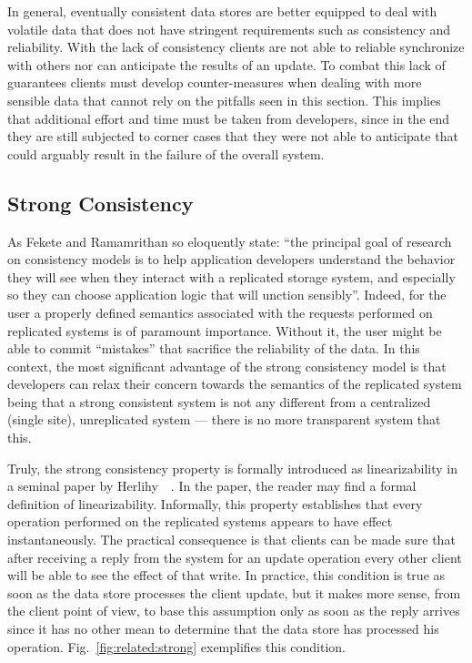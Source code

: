 In general, eventually consistent data stores are better equipped to deal with volatile data that does not have stringent requirements such as consistency and reliability.
With the lack of consistency clients are not able to reliable  synchronize with others nor can anticipate the results of an update. 
To combat this lack of guarantees clients must develop counter-measures when dealing with more sensible data that cannot rely on the pitfalls seen in this section. 
This implies that additional effort and time must be taken from developers, since in the end they are still subjected to corner cases that they were not able to anticipate  that could arguably result in the failure of the overall system. 


\subsection{Strong Consistency}
As Fekete and Ramamrithan so eloquently state: ``the principal goal of research on consistency models is to help application developers understand the behavior they will see when they interact with a replicated storage system, and especially so they can choose application logic that will unction sensibly''. \cite{fekete2010consistency}
Indeed, for the user a properly defined semantics associated with the requests performed on replicated systems is of paramount importance. 
Without it, the user might be able to commit ``mistakes'' that sacrifice the reliability of the data. 
In this context, the most significant advantage of the strong consistency model  is that developers can relax their concern towards the semantics of the replicated system being that a strong consistent system is not any different from a centralized (single site), unreplicated system --- there is no more transparent system that this. 

Truly, the strong consistency property is formally introduced as linearizability in a seminal paper by Herlihy~\etal~\cite{herlihy1990linearizability}. 
In the paper,  the reader may find a formal definition of linearizability. 
Informally, this property establishes that every operation performed on the replicated systems appears to have effect instantaneously. 
The practical consequence is that clients can be made sure that after receiving a reply from the system for an update operation every other client will be able to see the effect of that write. In practice, this condition is true as soon as the data store processes the client update, but it makes more sense, from the client point of view, to base this assumption only as soon as the reply arrives since it has no other mean to determine that the data store has processed his operation. Fig.~\ref{fig:related:strong} exemplifies this condition. 

